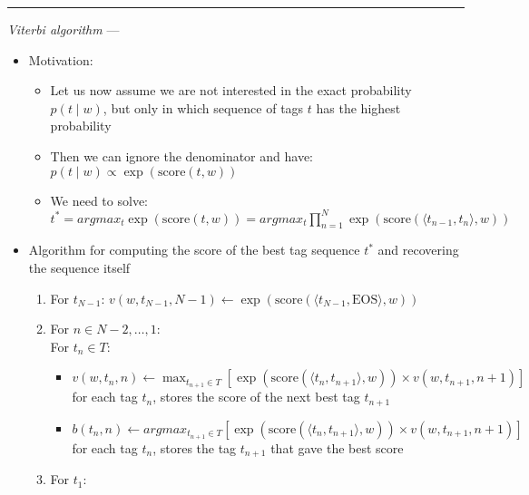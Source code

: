 {\color{lightgrey}\hrule height 0.001mm}

\emph{Viterbi algorithm} --- 
\begin{itemize}
    \item Motivation:
    \begin{itemize}
        \item Let us now assume we are not interested in the exact probability $p(t \mid w)$, but only in which sequence of tags $t$ has the highest probability
        \item Then we can ignore the denominator and have:
        $
        p(t \mid w) \propto \exp(\textrm{score}(t, w))
        $
        \item We need to solve:
        $
        t^* = argmax_t \exp(\textrm{score}(t, w)) = argmax_t \prod_{n=1}^N \exp(\textrm{score}(\langle t_{n-1}, t_n \rangle, w))
        $
    \end{itemize}
    \item Algorithm for computing the score of the best tag sequence $t^*$ and recovering the sequence itself
    \begin{enumerate}
        \item For $t_{N-1}$:
        $
        v(w, t_{N-1}, N-1) \gets \exp(\textrm{score}(\langle t_{N-1}, \textrm{EOS} \rangle, w))
        $
        \item For $n \in N-2, \dots, 1$:\\
        For $t_n \in T$:
        \begin{itemize}
            \item
            $
            v(w, t_n, n) \gets \max_{t_{n+1} \in T} \left[ \exp(\textrm{score}(\langle t_n, t_{n+1} \rangle, w)) \times v(w, t_{n+1}, n+1) \right]
            $ for each tag $t_n$, stores the score of the next best tag $t_{n+1}$ 
            \item $
            b(t_n, n) \gets argmax_{t_{n+1} \in T} \left[ \exp(\textrm{score}(\langle t_n, t_{n+1} \rangle, w)) \times v(w, t_{n+1}, n+1) \right]
            $ for each tag $t_n$, stores the tag $t_{n+1}$ that gave the best score
        \end{itemize}
        \item For $t_1$:
\end{enumerate}
\end{itemize}

